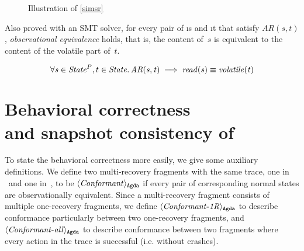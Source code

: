 	\begin{figure}[h] \centering
{}
		\caption{Illustration of \cref{simsr}}
\label{fig:sketch1}
	\end{figure}

Also proved with an SMT solver, for every pair of \i{s \in \ProgInvState} and \i{t \in \SpecState} that satisfy $AR(s,t)$, \emph{observational equivalence} holds, that is, the content of~$s$ is equivalent to the content of the volatile part of~$t$.
\begin{assumption}\label{ObsEquiv}
    $$
    \forall \mathit{s} \in \mathit{State}^P,t \in \mathit{State} \ldotp
    \mathit{AR(s, t)} \implies \mathit{read(s)} \equiv \mathit{volatile(t)}
    $$
\end{assumption}

\section{Behavioral correctness\\ and snapshot consistency of \ProgInv}\label{bcsc}

To state the behavioral correctness more easily, we give some auxiliary definitions. We define two multi-recovery fragments with the same trace, one in \Prog\ and one in~\Spec, to be $\langle \mathit{Conformant} \rangle_\mathtt{Agda}$ if every pair of corresponding normal states are observationally equivalent.
Since a multi-recovery fragment consists of multiple one-recovery fragments, we define $\langle \mathit{Conformant{\text-}1R} \rangle_\mathtt{Agda}$ to describe conformance particularly between two one-recovery fragments, and $\langle \mathit{Conformant{\text-}all} \rangle_\mathtt{Agda}$ to describe conformance between two fragments where every action in the trace is successful (i.e. without crashes).\\


